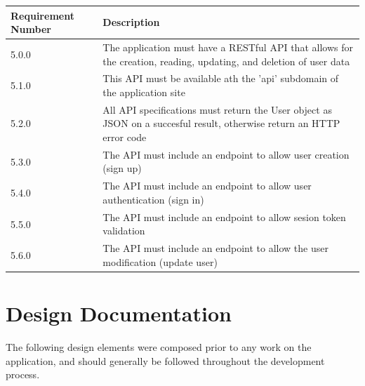 \documentclass[12pt]{article}
\begin{document}
\setlength{\tabcolsep}{1cm}
\begin{tabular}{|l|p{8cm}|}
    \hline
    Requirement Number & Description                                                                                                           \\

    \hline\hline
    5.0.0              & The application must have a RESTful API that allows for the creation, reading, updating, and deletion of user data    \\

    \hline\hline
    5.1.0              & This API must be available ath the 'api' subdomain of the application site                                            \\

    \hline\hline
    5.2.0              & All API specifications must return the User object as JSON on a succesful result, otherwise return an HTTP error code \\

    \hline\hline
    5.3.0              & The API must include an endpoint to allow user creation (sign up)                                                     \\

    \hline\hline
    5.4.0              & The API must include an endpoint to allow user authentication (sign in)                                               \\

    \hline\hline
    5.5.0              & The API must include an endpoint to allow sesion token validation                                                     \\

    \hline\hline
    5.6.0              & The API must include an endpoint to allow the user modification (update user)                                         \\

    \hline
\end{tabular}

\newpage

\section{Design Documentation}

The following design elements were composed prior to any work on the application, and should generally be followed throughout the development process.
\end{document}
